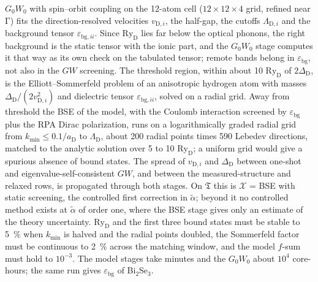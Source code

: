 $G_0W_0$ with spin--orbit coupling on the 12-atom cell ($12\times12\times4$ grid, refined near $\mathrm{\Gamma}$) fits the direction-resolved velocities $v_{\mathrm{D},i}$, the half-gap, the cutoffs $\Lambda_{\mathrm{D},i}$ and the background tensor $\varepsilon_{\mathrm{bg},ii}$. Since $\mathrm{Ry}_{\mathrm{D}}$ lies far below the optical phonons, the right background is the static tensor with the ionic part, and the $G_0W_0$ stage computes it that way as its own check on the tabulated tensor; remote bands belong in $\varepsilon_{\mathrm{bg}}$, not also in the $GW$ screening. The threshold region, within about 10 $\mathrm{Ry}_{\mathrm{D}}$ of $2\Delta_{\mathrm{D}}$, is the Elliott--Sommerfeld problem of an anisotropic hydrogen atom with masses $\Delta_{\mathrm{D}}/(2v_{\mathrm{D},i}^2)$ and dielectric tensor $\varepsilon_{\mathrm{bg},ii}$, solved on a radial grid. Away from threshold the BSE of the model, with the Coulomb interaction screened by $\varepsilon_{\mathrm{bg}}$ plus the RPA Dirac polarization, runs on a logarithmically graded radial grid from $k_{\mathrm{min}} \le 0.1/a_{\mathrm{D}}$ to $\Lambda_{\mathrm{D}}$, about 200 radial points times 590 Lebedev directions, matched to the analytic solution over 5 to 10 $\mathrm{Ry}_{\mathrm{D}}$; a uniform grid would give a spurious absence of bound states. The spread of $v_{\mathrm{D},i}$ and $\Delta_{\mathrm{D}}$ between one-shot and eigenvalue-self-consistent $GW$, and between the measured-structure and relaxed rows, is propagated through both stages. On $\mathfrak{T}$ this is $\mathcal{X}$ = BSE with static screening, the controlled first correction in $\tilde\alpha$; beyond it no controlled method exists at $\tilde\alpha$ of order one, where the BSE stage gives only an estimate of the theory uncertainty. $\mathrm{Ry}_{\mathrm{D}}$ and the first three bound states must be stable to \SI{5}{\percent} when $k_{\mathrm{min}}$ is halved and the radial points doubled, the Sommerfeld factor must be continuous to \SI{2}{\percent} across the matching window, and the model $f$-sum must hold to $10^{-3}$. The model stages take minutes and the $G_0W_0$ about $10^4$ core-hours; the same run gives $\varepsilon_{\mathrm{bg}}$ of Bi$_2$Se$_3$.

